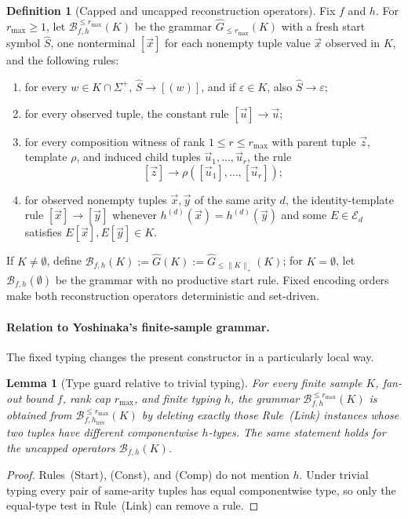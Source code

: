 \documentclass[11pt]{article}
\numberwithin{equation}{section}
\theoremstyle{plain}
\newtheorem{lemma}[theorem]{Lemma}
\theoremstyle{definition}
\newtheorem{definition}[theorem]{Definition}
\theoremstyle{remark}
\newcommand{\tuple}[1]{\vec{#1}}
\newcommand{\eps}{\varepsilon}
\begin{document}
\begin{definition}[Capped and uncapped reconstruction operators]
\label{def:reconstruction}
Fix $f$ and $h$.  For $r_{\max}\ge1$, let
$\mathcal B_{f,h}^{\le r_{\max}}(K)$ be the grammar
$\widehat G_{\le r_{\max}}(K)$ with a fresh start symbol $\widehat S$, one nonterminal $[\tuple x]$ for each nonempty tuple value $\tuple x$ observed in $K$,
and the following rules:
\begin{enumerate}[leftmargin=*]
\item[\textnormal{(Start)}] for every $w\in K\cap\Sigma^+$,
      $\widehat S\to[(w)]$, and if $\eps\in K$, also
      $\widehat S\to\eps$;
\item[\textnormal{(Const)}] for every observed tuple, the constant rule
      $[\tuple u]\to\tuple u$;
\item[\textnormal{(Comp)}] for every composition witness of rank
      $1\le r\le r_{\max}$ with parent tuple $\tuple z$, template $\rho$,
      and induced child tuples $\tuple u_1,\ldots,\tuple u_r$, the rule
      \[
        [\tuple z]\to\rho([\tuple u_1],\ldots,[\tuple u_r]);
      \]
\item[\textnormal{(Link)}] for observed nonempty tuples
      $\tuple x,\tuple y$ of the same arity $d$, the identity-template rule
      $[\tuple x]\to[\tuple y]$ whenever
      $h^{(d)}(\tuple x)=h^{(d)}(\tuple y)$ and some $E\in\mathcal E_d$
      satisfies $E[\tuple x],E[\tuple y]\in K$.
\end{enumerate}
If $K\ne\emptyset$, define
$\mathcal B_{f,h}(K):=\widehat G(K):=
\widehat G_{\le\|K\|_+}(K)$; for $K=\emptyset$, let
$\mathcal B_{f,h}(\emptyset)$ be the grammar with no productive start rule.
Fixed encoding orders make both reconstruction operators deterministic and
set-driven.
\end{definition}

\paragraph{Relation to Yoshinaka's finite-sample grammar.}
The fixed typing changes the present constructor in a particularly local way.
\begin{lemma}[Type guard relative to trivial typing]
\label{lem:type-guarded-subgrammar}
For every finite sample $K$, fan-out bound $f$, rank cap $r_{\max}$, and finite
typing $h$, the grammar $\mathcal B_{f,h}^{\le r_{\max}}(K)$ is obtained from
$\mathcal B_{f,h_{\mathrm{triv}}}^{\le r_{\max}}(K)$ by deleting exactly those
Rule~(Link) instances whose two tuples have different componentwise $h$-types.
The same statement holds for the uncapped operators $\mathcal B_{f,h}(K)$.
\end{lemma}
\begin{proof}
Rules~(Start), (Const), and (Comp) do not mention $h$.  Under trivial typing
every pair of same-arity tuples has equal componentwise type, so only the
equal-type test in Rule~(Link) can remove a rule.
\end{proof}
\end{document}
